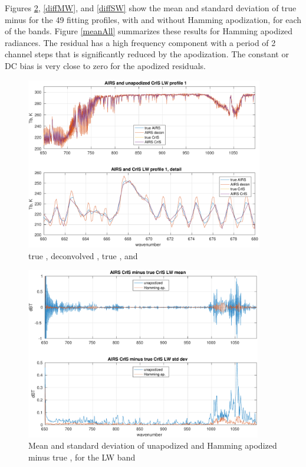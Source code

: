 \documentclass[11pt]{article}
\begin{document}
Figures \ref{diffLW}, \ref{diffMW}, and \ref{diffSW} show the mean
and standard deviation of true {\cris} minus {\airs} {\cris} for the
49 fitting profiles, with and without Hamming apodization, for each
of the {\cris} bands.  Figure \ref{meanAll} summarizes these results
for Hamming apodized radiances.  The residual has a high frequency
component with a period of 2 channel steps that is significantly
reduced by the apodization.  The constant or DC bias is very close
to zero for the apodized residuals.


\begin{figure} %
  \centering
  \includegraphics[height=7.5cm]{figures/a2cris_spec_LW.pdf}
  \caption{true {\airs}, deconvolved {\airs}, true {\cris}, and
    {\airs} {\cris}}
  \label{specLW}
\end{figure}

\begin{figure} %
  \centering
  \includegraphics[height=7.5cm]{figures/a2cris_diff_LW.pdf}
  \caption{Mean and standard deviation of unapodized and Hamming
    apodized {\airs} {\cris} minus true {\cris}, for the {\cris} LW
    band}
  \label{diffLW}
\end{figure}
\end{document}
